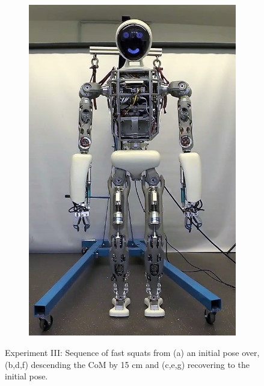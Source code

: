 \begin{figure}
\begin{subfigure}{.14\textwidth}
	\includegraphics[width=.95\linewidth]{experiments/squats/snaps/7}
	\caption{}
	\end{subfigure}%
\caption[Experiment III: Sequence of fast squats]{Experiment III: Sequence of fast squats from (a) an initial pose over, (b,d,f) descending the \gls{CoM} by 15 cm and (c,e,g) recovering to the initial pose.}
\label{exp:squatSnaps}
\end{figure} 

